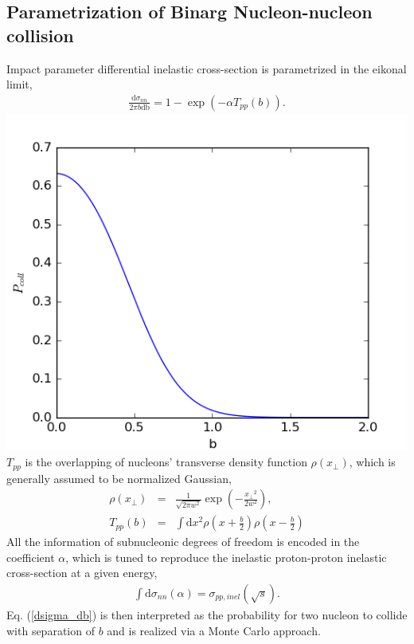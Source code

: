 \documentclass[aps,prl,twocolumn,groupedaddress]{revtex4-1}
\begin{document}
	\subsection{Parametrization of Binarg Nucleon-nucleon collision}
	Impact parameter differential inelastic cross-section is parametrized in the eikonal limit,
	\begin{eqnarray}\label{dsigma_db}
		\frac{\mathrm{d}\sigma_{nn}}{2\pi b \mathrm{db}} = 1 - \exp\left(-\alpha T_{pp} (b)\right).
	\end{eqnarray}
	\includegraphics[width=\columnwidth]{pics/Pcoll.png}
	$T_{pp}$ is the overlapping of nucleons' transverse density function $\rho(x_\perp)$, which is generally assumed to be normalized Gaussian,
	\begin{eqnarray}
		\rho(x_\perp) &=& \frac{1}{\sqrt{2\pi w^2}}\exp\left(-\frac{{x_\perp}^2}{2w^2}\right), \\
		T_{pp}(b) &=& \int \mathrm{d}{x}^2 \rho(x+\frac{b}{2})\rho(x-\frac{b}{2})
	\end{eqnarray}
	All the information of subnucleonic degrees of freedom is encoded in the coefficient $\alpha$, which is tuned to reproduce the inelastic proton-proton inelastic cross-section at a given energy,
	\begin{eqnarray}
		\int \mathrm{d}\sigma_{nn}(\alpha) = \sigma_{pp, inel}(\sqrt{s}).
	\end{eqnarray}
	Eq. (\ref{dsigma_db}) is then interpreted as the probability for two nucleon to collide with separation of $b$ and is realized via a Monte Carlo approach.
\end{document}
